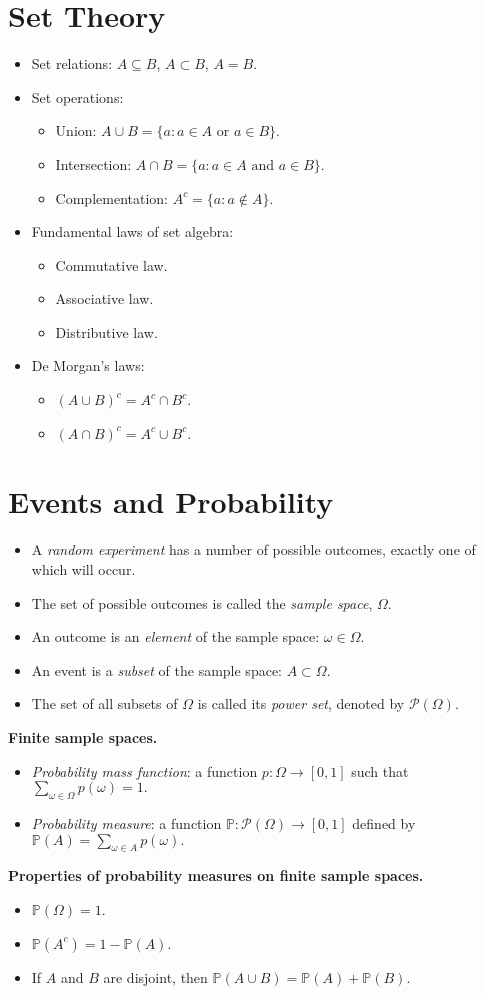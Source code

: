 \documentclass[lecture]{csm}
\newcommand{\prob}{\mathbb{P}}
\def\it{\item}
\def\bit{\begin{itemize}}
\def\eit{\end{itemize}}
\begin{document}
\maketitle
\newpage
\section{Set Theory}
\bit
\it Set relations: $A\subseteq B$, $A\subset B$, $A=B$.
\it Set operations: 
	\bit
	\it Union: $A\cup B= \{a: a\in A \text{ or }a\in B\}$.
	\it Intersection: $A\cap B = \{a: a\in A \text{ and }a\in B\}$.
	\it Complementation: $A^c =\{a: a\notin A\}$.
	\eit
\it Fundamental laws of set algebra: 
	\bit
	\it Commutative law.
	\it Associative law.
	\it Distributive law.
	\eit
\it De Morgan's laws:
	\bit
	\it $(A\cup B)^c = A^c\cap B^c$.
	\it $(A\cap B)^c = A^c\cup B^c$.
	\eit
\eit
\newpage
\section{Events and Probability}
\bit
\it A \emph{random experiment} has a number of possible outcomes, exactly one of which will occur.
\it The set of possible outcomes is called the \emph{sample space}, $\Omega$.
\it An outcome is an \emph{element} of the sample space: $\omega\in\Omega$.
\it An event is a \emph{subset} of the sample space: $A\subset\Omega$.
\it The set of all subsets of $\Omega$ is called its \emph{power set}, denoted by $\mathcal{P}(\Omega)$.
\eit

\textbf{Finite sample spaces.}
\bit
\it \emph{Probability mass function}: a function $p:\Omega\to[0,1]$ such that 
$\displaystyle\sum_{\omega\in\Omega} p(\omega) = 1.$
\it \emph{Probability measure}: a function $\prob:\mathcal{P}(\Omega)\to[0,1]$ defined by
$\displaystyle\prob(A) = \sum_{\omega\in A} p(\omega).$
\eit
\textbf{Properties of probability measures on finite sample spaces.}
	\bit
	\it $\prob(\Omega)=1$.
	\it $\prob(A^c) = 1 - \prob(A)$.
	\it If $A$ and $B$ are disjoint, then $\prob(A\cup B) = \prob(A)+\prob(B)$.
	\eit
\newpage
\end{document}
